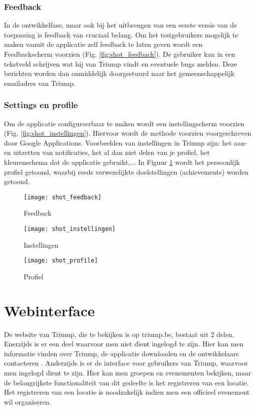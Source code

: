 \subsubsection{Feedback}%
In de ontwikkelfase, maar ook bij het uitbrengen van een eerste versie van de toepassing is feedback van cruciaal belang. Om het testgebruikers mogelijk te maken vanuit de applicatie zelf feedback te laten geven wordt een Feedbackscherm voorzien (Fig. \ref{fig:shot_feedback}). De gebruiker kan in een tekstveld schrijven wat hij van Triump vindt en eventuele bugs melden. Deze berichten worden dan onmiddelijk doorgestuurd naar het gemeenschappelijk emailadres van Triump.
\subsubsection{Settings en profile}%
Om de applicatie configureerbaar te maken wordt een instellingscherm voorzien (Fig. \ref{fig:shot_instellingen}). Hiervoor wordt de methode voorzien voorgeschreven door Google Applications.
Voorbeelden van instellingen in Triump zijn: het aan- en uitzetten van notificaties, het al dan niet delen van je profiel, het kleurenschema dat de applicatie gebruikt,... 
In Figuur \ref{fig:shot_profile} wordt het persoonlijk profiel getoond, waarbij reeds verwezelijkte doelstellingen (achievements) worden getoond. 

\begin{figure}[ht]

\begin{minipage}[b]{0.25\linewidth}
\centering
\texttt{[image: shot\_feedback]}
\caption{Feedback}
\label{fig:shot_feedback}
\end{minipage}
\hspace{1.5cm}
\begin{minipage}[b]{0.25\linewidth}
\centering
\texttt{[image: shot\_instellingen]}
\caption{Instellingen}
\label{fig:shot_instellingen}
\end{minipage}
\hspace{1.5cm}
\begin{minipage}[b]{0.25\linewidth}
\centering
\texttt{[image: shot\_profile]}
\caption{Profiel}
\label{fig:shot_profile}
\end{minipage}
\end{figure}

\section{Webinterface}%
De website van Triump, die te bekijken is op triump.be, bestaat uit 2 delen. Enerzijds is er een deel waarvoor men niet dient ingelogd te zijn. Hier kan men informatie vinden over Triump, de applicatie downloaden en de ontwikkelaars contacteren . Anderzijds is er de interface voor gebruikers van Triump, waarvoor men ingelogd dient te zijn. Hier kan men groepen en evenementen bekijken, maar de belangrijkste functionaliteit van dit gedeelte is het registreren van een locatie.
Het registreren van een locatie is noodzakelijk indien men een officieel evenement wil organiseren.
